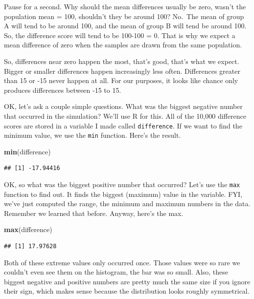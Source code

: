 \documentclass[
]{book}
\newenvironment{Shaded}{\begin{snugshade}}{\end{snugshade}}
\newcommand{\FunctionTok}[1]{\textcolor[rgb]{0.13,0.29,0.53}{\textbf{#1}}}
\newcommand{\NormalTok}[1]{#1}
\begin{document}
Pause for a second. Why should the mean differences usually be zero, wasn't the population mean = 100, shouldn't they be around 100? No.~The mean of group A will tend to be around 100, and the mean of group B will tend be around 100. So, the difference score will tend to be 100-100 = 0. That is why we expect a mean difference of zero when the samples are drawn from the same population.

So, differences near zero happen the most, that's good, that's what we expect. Bigger or smaller differences happen increasingly less often. Differences greater than 15 or -15 never happen at all. For our purposes, it looks like chance only produces differences between -15 to 15.

OK, let's ask a couple simple questions. What was the biggest negative number that occurred in the simulation? We'll use R for this. All of the 10,000 difference scores are stored in a variable I made called \texttt{difference}. If we want to find the minimum value, we use the \texttt{min} function. Here's the result.

\begin{Shaded}
\begin{Highlighting}[]
\FunctionTok{min}\NormalTok{(difference)}
\end{Highlighting}
\end{Shaded}

\begin{verbatim}
## [1] -17.94416
\end{verbatim}

OK, so what was the biggest positive number that occurred? Let's use the \texttt{max} function to find out. It finds the biggest (maximum) value in the variable. FYI, we've just computed the range, the minimum and maximum numbers in the data. Remember we learned that before. Anyway, here's the max.

\begin{Shaded}
\begin{Highlighting}[]
\FunctionTok{max}\NormalTok{(difference)}
\end{Highlighting}
\end{Shaded}

\begin{verbatim}
## [1] 17.97628
\end{verbatim}

Both of these extreme values only occurred once. Those values were so rare we couldn't even see them on the histogram, the bar was so small. Also, these biggest negative and positive numbers are pretty much the same size if you ignore their sign, which makes sense because the distribution looks roughly symmetrical.
\end{document}
